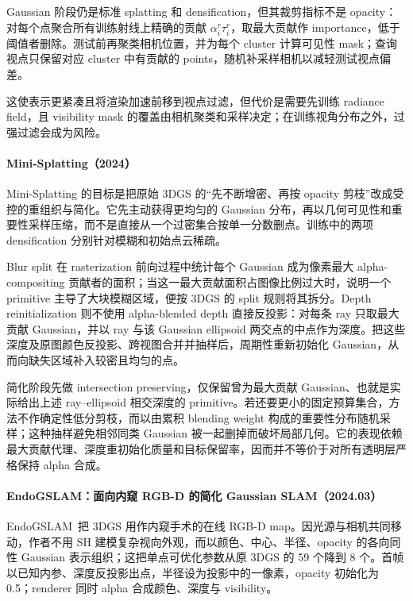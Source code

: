 Gaussian 阶段仍是标准 splatting 和 densification，但其裁剪指标不是 opacity：对每个点聚合所有训练射线上精确的贡献 $\alpha_i^r\tau_i^r$，取最大贡献作 importance，低于阈值者删除。测试前再聚类相机位置，并为每个 cluster 计算可见性 mask；查询视点只保留对应 cluster 中有贡献的 points，随机补采样相机以减轻测试视点偏差。

这使表示更紧凑且将渲染加速前移到视点过滤，但代价是需要先训练 radiance field，且 visibility mask 的覆盖由相机聚类和采样决定；在训练视角分布之外，过强过滤会成为风险。


\paragraph{Mini-Splatting（2024）\cite{2403_14166}}
Mini-Splatting 的目标是把原始 3DGS 的“先不断增密、再按 opacity 剪枝”改成受控的重组织与简化。它先主动获得更均匀的 Gaussian 分布，再以几何可见性和重要性采样压缩，而不是直接从一个过密集合按单一分数删点。训练中的两项 densification 分别针对模糊和初始点云稀疏。

Blur split 在 rasterization 前向过程中统计每个 Gaussian 成为像素最大 alpha-compositing 贡献者的面积；当这一最大贡献面积占图像比例过大时，说明一个 primitive 主导了大块模糊区域，便按 3DGS 的 split 规则将其拆分。Depth reinitialization 则不使用 alpha-blended depth 直接反投影：对每条 ray 只取最大贡献 Gaussian，并以 ray 与该 Gaussian ellipsoid 两交点的中点作为深度。把这些深度及原图颜色反投影、跨视图合并并抽样后，周期性重新初始化 Gaussian，从而向缺失区域补入较密且均匀的点。

简化阶段先做 intersection preserving，仅保留曾为最大贡献 Gaussian、也就是实际给出上述 ray--ellipsoid 相交深度的 primitive。若还要更小的固定预算集合，方法不作确定性低分剪枝，而以由累积 blending weight 构成的重要性分布随机采样；这种抽样避免相邻同类 Gaussian 被一起删掉而破坏局部几何。它的表现依赖最大贡献代理、深度重初始化质量和目标保留率，因而并不等价于对所有透明层严格保持 alpha 合成。

\paragraph{EndoGSLAM：面向内窥 RGB-D 的简化 Gaussian SLAM（2024.03）}
EndoGSLAM~\cite{2403_15124}把 3DGS 用作内窥手术的在线 RGB-D map。因光源与相机共同移动，作者不用 SH 建模复杂视向外观，而以颜色、中心、半径、opacity 的各向同性 Gaussian 表示组织；这把单点可优化参数从原 3DGS 的 59 个降到 8 个。首帧以已知内参、深度反投影出点，半径设为投影中的一像素，opacity 初始化为 0.5；renderer 同时 alpha 合成颜色、深度与 visibility。

